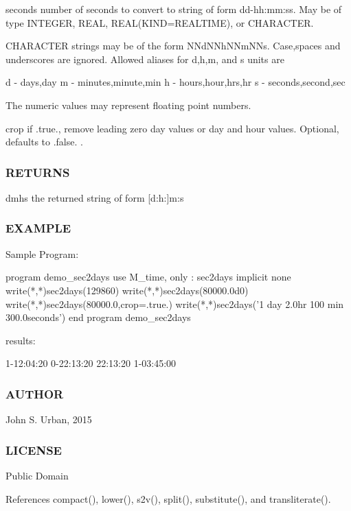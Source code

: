 seconds number of seconds to convert to string of form dd-\/hh\+:mm\+:ss. May be of type I\+N\+T\+E\+G\+ER, R\+E\+AL, R\+E\+AL(K\+I\+ND=R\+E\+A\+L\+T\+I\+ME), or C\+H\+A\+R\+A\+C\+T\+ER.

C\+H\+A\+R\+A\+C\+T\+ER strings may be of the form N\+Nd\+N\+Nh\+N\+Nm\+N\+Ns. Case,spaces and underscores are ignored. Allowed aliases for d,h,m, and s units are \begin{DoxyVerb}d -  days,day
m -  minutes,minute,min
h -  hours,hour,hrs,hr
s -  seconds,second,sec
\end{DoxyVerb}


The numeric values may represent floating point numbers.

crop if .true., remove leading zero day values or day and hour values. Optional, defaults to .false. . \subsubsection*{R\+E\+T\+U\+R\+NS}

dmhs the returned string of form \mbox{[}d\+:h\+:\mbox{]}m\+:s

\subsubsection*{E\+X\+A\+M\+P\+LE}

\begin{DoxyVerb}Sample Program:

 program demo_sec2days
 use M_time, only : sec2days
 implicit none
    write(*,*)sec2days(129860)
    write(*,*)sec2days(80000.0d0)
    write(*,*)sec2days(80000.0,crop=.true.)
    write(*,*)sec2days('1 day 2.0hr 100 min 300.0seconds')
 end program demo_sec2days

results:

 1-12:04:20
 0-22:13:20
 22:13:20
 1-03:45:00
\end{DoxyVerb}


\subsubsection*{A\+U\+T\+H\+OR}

John S. Urban, 2015 \subsubsection*{L\+I\+C\+E\+N\+SE}

Public Domain 

References compact(), lower(), s2v(), split(), substitute(), and transliterate().

